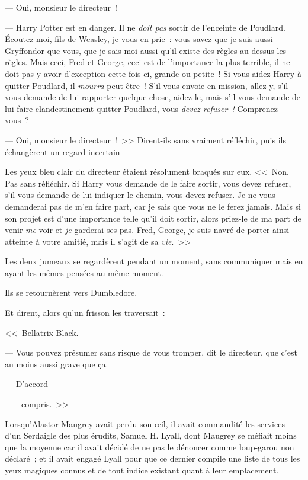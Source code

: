 --- Oui, monsieur le directeur~!

--- Harry Potter est en danger. Il ne \emph{doit pas} sortir de l'enceinte de Poudlard. Écoutez-moi, fils de Weasley, je vous en prie~: vous savez que je suis aussi Gryffondor que vous, que je sais moi aussi qu'il existe des règles au-dessus les règles. Mais ceci, Fred et George, ceci est de l'importance la plus terrible, il ne doit pas y avoir d'exception cette fois-ci, grande ou petite~! Si vous aidez Harry à quitter Poudlard, il \emph{mourra} peut-être~! S'il vous envoie en mission, allez-y, s'il vous demande de lui rapporter quelque chose, aidez-le, mais s'il vous demande de lui faire clandestinement quitter Poudlard, vous \emph{devez refuser~!} Comprenez-vous~?

--- Oui, monsieur le directeur~!~>> Dirent-ils sans vraiment réfléchir, puis ils échangèrent un regard incertain -

Les yeux bleu clair du directeur étaient résolument braqués sur eux. <<~Non. Pas sans réfléchir. Si Harry vous demande de le faire sortir, vous devez refuser, s'il vous demande de lui indiquer le chemin, vous devez refuser. Je ne vous demanderai pas de m'en faire part, car je sais que vous ne le ferez jamais. Mais si son projet est d'une importance telle qu'il doit sortir, alors priez-le de ma part de venir \emph{me} voir et \emph{je} garderai ses pas. Fred, George, je suis navré de porter ainsi atteinte à votre amitié, mais il s'agit de sa \emph{vie}.~>>

Les deux jumeaux se regardèrent pendant un moment, sans communiquer mais en ayant les mêmes pensées au même moment.

Ils se retournèrent vers Dumbledore.

Et dirent, alors qu'un frisson les traversait~:

<<~Bellatrix Black.

--- Vous pouvez présumer sans risque de vous tromper, dit le directeur, que c'est au moins aussi grave que ça.

--- D'accord -

--- - compris.~>>


Lorsqu'Alastor Maugrey avait perdu son œil, il avait commandité les services d'un Serdaigle des plus érudits, Samuel H. Lyall, dont Maugrey se méfiait moins que la moyenne car il avait décidé de ne pas le dénoncer comme loup-garou non déclaré~; et il avait engagé Lyall pour que ce dernier compile une liste de tous les yeux magiques connus et de tout indice existant quant à leur emplacement.

